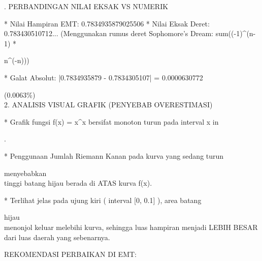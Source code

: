 \documentclass{article}
\newenvironment{eulernotebook}{\par}{\par}
\newenvironment{eulercomment}{\par\medskip}{\par\medskip}
\begin{document}
\begin{eulernotebook}
\begin{eulercomment}
\begin{eulercomment}
\begin{eulercomment}
\begin{eulercomment}
\begin{eulercomment}
. PERBANDINGAN NILAI EKSAK VS NUMERIK\\
\end{eulercomment}
\begin{eulerttcomment}
  * Nilai Hampiran EMT:  0.7834935879025506
  * Nilai Eksak Deret:   0.783430510712...
    (Menggunakan rumus deret Sophomore's Dream: sum((-1)^(n-1) *
\end{eulerttcomment}
\begin{eulercomment}
n\textasciicircum{}(-n)))\\
\end{eulercomment}
\begin{eulerttcomment}
  * Galat Absolut:       |0.7834935879 - 0.7834305107| = 0.0000630772
\end{eulerttcomment}
\begin{eulercomment}
(0.0063\%)\\
2. ANALISIS VISUAL GRAFIK (PENYEBAB OVERESTIMASI)\\
\end{eulercomment}
\begin{eulerttcomment}
  * Grafik fungsi f(x) = x^x bersifat monoton turun pada interval x in
\end{eulerttcomment}
\begin{eulercomment}
[0, 0.3679].\\
\end{eulercomment}
\begin{eulerttcomment}
  * Penggunaan Jumlah Riemann Kanan pada kurva yang sedang turun
\end{eulerttcomment}
\begin{eulercomment}
menyebabkan\\
tinggi batang hijau berada di ATAS kurva f(x).\\
\end{eulercomment}
\begin{eulerttcomment}
  * Terlihat jelas pada ujung kiri ( interval [0, 0.1] ), area batang
\end{eulerttcomment}
\begin{eulercomment}
hijau\\
menonjol keluar melebihi kurva, sehingga luas hampiran menjadi LEBIH
BESAR\\
dari luas daerah yang sebenarnya.

REKOMENDASI PERBAIKAN DI EMT:


\end{eulercomment}
\end{eulercomment}
\end{eulercomment}
\end{eulercomment}
\end{eulercomment}
\end{eulernotebook}
\end{document}
